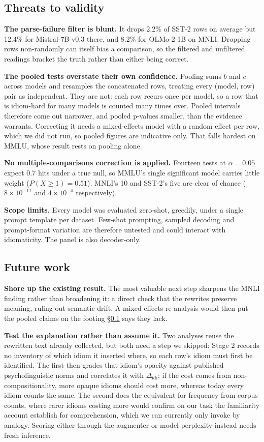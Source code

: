 \documentclass{article}   %
\newcommand{\citetf}[1]{\citet{#1}}
\begin{document}
\subsection{Threats to validity}
\label{sec:threats}

\textbf{The parse-failure filter is blunt.} It drops 2.2\% of SST-2 rows on
average but 12.4\% for Mistral-7B-v0.3 there, and 8.2\% for OLMo-2-1B on MNLI.
Dropping rows non-randomly can itself bias a comparison, so the filtered and
unfiltered readings bracket the truth rather than either being correct.

\textbf{The pooled tests overstate their own confidence.} Pooling sums $b$ and
$c$ across models and resamples the concatenated rows, treating every (model,
row) pair as independent. They are not: each row recurs once per model, so a
row that is idiom-hard for many models is counted many times over. Pooled
intervals therefore come out narrower, and pooled p-values smaller, than the
evidence warrants. Correcting it needs a mixed-effects model with a random
effect per row, which we did not run, so pooled figures are indicative only.
That falls hardest on MMLU, whose result rests on pooling alone.

\textbf{No multiple-comparisons correction is applied.} Fourteen tests at
$\alpha = 0.05$ expect 0.7 hits under a true null, so MMLU's single significant
model carries little weight ($P(X \geq 1) = 0.51$). MNLI's 10 and SST-2's five
are clear of chance ($8 \times 10^{-11}$ and $4 \times 10^{-4}$ respectively).

\textbf{Scope limits.} Every model was evaluated zero-shot, greedily, under a
single prompt template per dataset. Few-shot prompting, sampled decoding and
prompt-format variation are therefore untested and could interact with
idiomaticity. The panel is also decoder-only.

\subsection{Future work}
\label{sec:futurework}

\textbf{Shore up the existing result.} The most valuable next step sharpens the
MNLI finding rather than broadening it: a direct check that the rewrites
preserve meaning, ruling out semantic drift. A mixed-effects re-analysis would
then put the pooled claims on the footing \S\ref{sec:threats} says they lack.

\textbf{Test the explanation rather than assume it.} Two analyses reuse the
rewritten text already collected, but both need a step we skipped: Stage 2
records no inventory of which idiom it inserted where, so each row's idiom must
first be identified. The first then grades that idiom's opacity against
published psycholinguistic norms and correlates it with $\Delta_{\text{idi}}$;
if the cost comes from non-compositionality, more opaque idioms should cost
more, whereas today every idiom counts the same. The second does the equivalent
for frequency from corpus counts, where rarer idioms costing more would confirm
on our task the familiarity account \citetf{tayyar2021astitch} establish for
comprehension, which we can currently only invoke by analogy. Scoring either
through the augmenter or model perplexity instead needs fresh inference.
\end{document}
